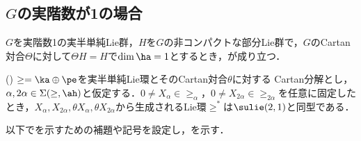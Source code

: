 \subsection{$ G$の実階数が1の場合}

\begin{thm}\label{thm:1216-main}
  $G$を実階数1の実半単純Lie群，$H$を$G$の非コンパクトな部分Lie群で，$G$のCartan対合$\Theta$に対して$\Theta H = H$で$\dim \ha = 1$とするとき，が成り立つ．
\end{thm}

\begin{thm}\label{thm:0810}(\cite[p.~409, Theorem~3.1]{hel01})
  $\ge = \ka \oplus \pe$を実半単純Lie環とそのCartan対合$\theta$に対する Cartan分解とし，$\alpha,2\alpha\in \Sigma(\ge,\ah) $と仮定する．$0\neq X_{\alpha}\in \ge_{\alpha} $，$0\neq X_{2\alpha}\in \ge_{2\alpha} $を任意に固定したとき，$X_{\alpha},X_{2\alpha}, \theta X_{\alpha}, \theta X_{2\alpha} $から生成されるLie環$\ge^{*} $は$\sulie(2,1)$と同型である．
  
\end{thm}
以下でを示すための補題や記号を設定し，を示す．
